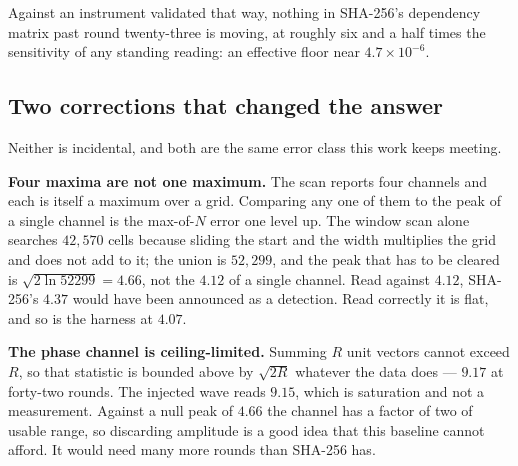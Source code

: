 Against an instrument validated that way, nothing in SHA-256's dependency matrix past round
twenty-three is moving, at roughly six and a half times the sensitivity of any standing reading:
an effective floor near \(4.7 \times 10^{-6}\).

\subsection{Two corrections that changed the answer}

Neither is incidental, and both are the same error class this work keeps meeting.

\textbf{Four maxima are not one maximum.} The scan reports four channels and each is itself a
maximum over a grid. Comparing any one of them to the peak of a single channel is the max-of-\(N\)
error one level up. The window scan alone searches \(42{,}570\) cells because sliding the start and
the width multiplies the grid and does not add to it; the union is \(52{,}299\), and the peak
that has to be cleared is \(\sqrt{2 \ln 52299} = 4.66\), not the \(4.12\) of a single channel.
Read against \(4.12\), SHA-256's \(4.37\) would have been announced as a detection. Read correctly
it is flat, and so is the harness at \(4.07\).

\textbf{The phase channel is ceiling-limited.} Summing \(R\) unit vectors cannot exceed \(R\), so
that statistic is bounded above by \(\sqrt{2R}\) whatever the data does --- \(9.17\) at forty-two
rounds. The injected wave reads \(9.15\), which is saturation and not a measurement. Against a
null peak of \(4.66\) the channel has a factor of two of usable range, so discarding amplitude is a
good idea that this baseline cannot afford. It would need many more rounds than SHA-256 has.

